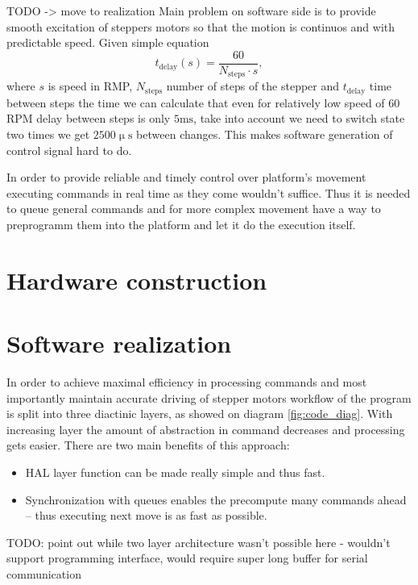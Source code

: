 TODO -> move to realization
Main problem on software side is to provide smooth excitation of steppers motors so that the motion is continuos and with predictable speed.
Given simple equation
%
\begin{equation}
	t_{\mathrm{delay}}(s) = \frac{60}{N_{\mathrm{steps}} \cdot s},
	\label{eq:delay}
\end{equation}
%
where  $s$ is speed in RMP, $N_{\mathrm{steps}}$ number of steps of the stepper and  $t_{\mathrm{delay}}$ time between steps the time we can calculate that even for relatively low speed of 60 RPM delay between steps is only $5\mathrm{ms}$, take into account we need to switch state two times we get $2500\upmu\mathrm{s}$ between changes. This makes software generation of control signal hard to do.


In order to provide reliable and timely control over platform's movement executing commands in real time as they come wouldn't suffice.
Thus it is needed to queue general commands and for more complex movement have a way to preprogramm them into the platform and let it do the execution itself.



\chapter{Hardware construction}



\chapter{Software realization}

In order to achieve maximal efficiency in processing commands and  most importantly maintain accurate driving of stepper motors workflow of the program is split into three diactinic layers, as showed on diagram \ref{fig:code_diag}.
With increasing layer the amount of abstraction in command decreases and processing gets easier.
There are two main benefits of this approach:
\begin{itemize}
	\item HAL layer function can be made really simple and thus fast.
	\item Synchronization with queues enables the precompute many commands ahead -- thus executing next move is as fast as possible.
\end{itemize}

TODO: point out while two layer architecture wasn't possible here - wouldn't support programming interface, would require super long buffer for serial communication

